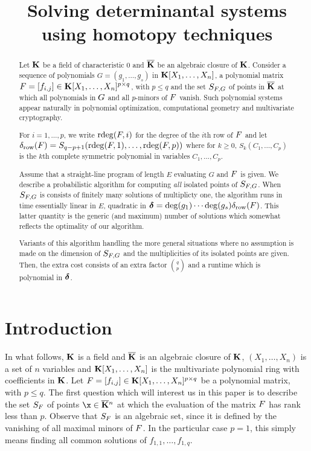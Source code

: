 \documentclass[12pt]{article}
\title{Solving determinantal systems using homotopy techniques}
\begin{document}
\maketitle

\begin{abstract}
  Let $\mathbf{K}$ be a field of characteristic $0$ and $\overline{\mathbf{K}}$ be an
  algebraic closure of $\mathbf{K}$. Consider a sequence of polynomials
  $G=(g_1,\dots,g_s)$ in $\mathbf{K}[X_1,\dots,X_n]$, a polynomial matrix
  ${F}=[f_{i,j}] \in \mathbf{K}[X_1,\dots,X_n]^{p \times q}$, with $p \leq q$
  and the set $S_{{F}, G}$ of points in $\overline{\mathbf{K}}$ at which all
  polynomials in ${G}$ and all $p$-minors of ${F}$ vanish. Such
  polynomial systems appear naturally in polynomial optimization,
  computational geometry and multivariate cryptography.

  For $i=1,\dots,p$, we write $\mathrm{rdeg}({F},i)$ for the degree of the
  $i$th row of ${F}$ and let
  $\delta_{\rm row}({F}) = S_{q-p+1}(\mathrm{rdeg}({F},1), \ldots,
  \mathrm{rdeg}({F},p))$
  where for $k\ge 0$, $S_k(C_1,\dots,C_p)$ is the $k$th complete
  symmetric polynomial in variables $C_1,\dots,C_p$.

  Assume that a straight-line program of length $E$ evaluating $G$ and
  ${F}$ is given.  We describe a probabilistic algorithm for computing
  \emph{all} isolated points of $S_{{F}, G}$. When $S_{{F}, G}$ is
  consists of finitely many solutions of multiplicty one, the
  algorithm runs in time essentially linear in $E$, quadratic in
  $\mbox{\boldmath$\delta$}= \deg(g_1)\cdots \deg(g_s)\delta_{{\rm row}}({F})$.  This
  latter quantity is the generic (and maximum) number of solutions
  which somewhat reflects the optimality of our algorithm.

  Variants of this algorithm handling the more general situations
  where no assumption is made on the dimension of $S_{{F}, G}$ and the
  multiplicities of its isolated points are given. Then, the extra
  cost consists of an extra factor ${{q}\choose{p}}$ and a runtime
  which is polynomial in $\mbox{\boldmath$\delta$}$.
\end{abstract}

\section{Introduction}\label{sec:intro}

In what follows, $\mathbf{K}$ is a field and $\overline{\mathbf{K}}$ is an algebraic closure
of $\mathbf{K}$, $(X_1, \ldots, X_n)$ is a set of $n$ variables and
$\mathbf{K}[X_1,\dots,X_n]$ is the multivariate polynomial ring with
coefficients in $\mathbf{K}$. Let
${F}=[f_{i,j}] \in \mathbf{K}[X_1,\dots,X_n]^{p \times q}$ be a polynomial
matrix, with $p \leq q$. The first question which will interest us in
this paper is to describe the set $S_{{F}}$ of points
$\x \in \KKbar{}^n$ at which the evaluation of the matrix ${F}$ has
rank less than $p$. Observe that $S_{{F}}$ is an algebraic set, since it
is defined by the vanishing of all maximal minors of ${F}$.  In the
particular case $p=1$, this simply means finding all common solutions
of $f_{1,1},\dots,f_{1,q}$. 
\end{document}
